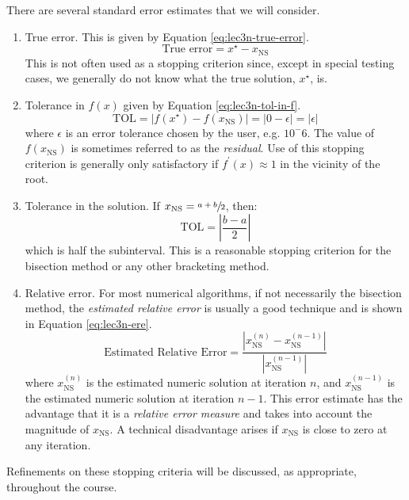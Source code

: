 \vspace{0.25cm}

\noindent There are several standard error estimates that we will consider.

\begin{enumerate}
\item True error.  This is given by Equation \ref{eq:lec3n-true-error}.
\begin{equation}
\text{True error} = x^{\star} - x_{\text{NS}}
\label{eq:lec3n-true-error}
\end{equation}
This is not often used as a stopping criterion since, except in special testing cases, we generally do not know what the true solution, $x^{\star}$, is.

\vspace{3.0cm}

\item Tolerance in $f(x)$ given by Equation \ref{eq:lec3n-tol-in-f}.
\begin{equation}
\text{TOL} = \left| f(x^{\star}) - f(x_{\text{NS}})\right| = \left|0-\epsilon \right| = \left|\epsilon\right|
\label{eq:lec3n-tol-in-f}
\end{equation}
where $\epsilon$ is an error tolerance chosen by the user, e.g. $10^-6$.  The value of $f(x_{\text{NS}})$ is sometimes referred to as the \emph{residual}.  Use of this stopping criterion is generally only satisfactory if $f^{\prime}(x) \approx 1$ in the vicinity of the root.

\item Tolerance in the solution. If $x_{\text{NS}} = \sfrac{a+b}{2}$, then:
\begin{equation*}
\text{TOL} = \left|\frac{b-a}{2} \right|
\end{equation*}
which is half the subinterval.  This is a reasonable stopping criterion for the bisection method or any other bracketing method.  

\item Relative error.  For most numerical algorithms, if not necessarily the bisection method, the \emph{estimated relative error} is usually a good technique and is shown in Equation \ref{eq:lec3n-ere}.
\begin{equation}
\text{Estimated Relative Error} = \frac{\left|x_{\text{NS}}^{(n)} - x_{\text{NS}}^{(n-1)}\right|}{\left|x_{\text{NS}}^{(n-1)}\right|} 
\label{eq:lec3n-ere}
\end{equation}
where $x_{\text{NS}}^{(n)}$ is the estimated numeric solution at iteration $n$, and $x_{\text{NS}}^{(n-1)}$ is the estimated numeric solution at iteration $n-1$.  This error estimate has the advantage that it is a \emph{relative error measure} and takes into account the magnitude of $x_{\text{NS}}$.  A technical disadvantage arises if $x_{\text{NS}}$ is close to zero at any iteration.  
\end{enumerate}
Refinements on these stopping criteria will be discussed, as appropriate, throughout the course.

